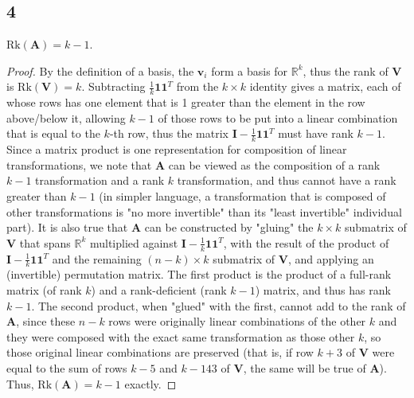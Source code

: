 \documentclass[11pt]{article}
\begin{document}
\subsection*{4} $\mathrm{Rk}(\mathbf{A}) = k-1$.\ \begin{proof} By the definition of a basis, the $\mathbf{v}_i$ form a basis for $\mathbb{R}^k$, thus the rank of $\mathbf{V}$ is $\mathrm{Rk}(\mathbf{V}) = k$. Subtracting $\frac{1}{k}\mathbf{1}\mathbf{1}^T$ from the $k\times k$ identity gives a matrix, each of whose rows has one element that is 1 greater than the element in the row above/below it, allowing $k-1$ of those rows to be put into a linear combination that is equal to the $k$-th row, thus the matrix $\mathbf{I} - \frac{1}{k}\mathbf{1}\mathbf{1}^T$ must have rank $k-1$. Since a matrix product is one representation for composition of linear transformations, we note that $\mathbf{A}$ can be viewed as the composition of a rank $k-1$ transformation and a rank $k$ transformation, and thus cannot have a rank greater than $k-1$ (in simpler language, a transformation that is composed of other transformations is "no more invertible" than its "least invertible" individual part). It is also true that $\mathbf{A}$ can be constructed by "gluing"  the $k\times k$ submatrix of $\mathbf{V}$ that spans $\mathbb{R}^k$ multiplied against  $\mathbf{I} - \frac{1}{k}\mathbf{1}\mathbf{1}^T$, with the result of the product of $\mathbf{I} - \frac{1}{k}\mathbf{1}\mathbf{1}^T$ and the remaining $(n-k)\times k$ submatrix of $\mathbf{V}$, and applying an (invertible) permutation matrix. The first product is the product of a full-rank matrix (of rank $k$) and a rank-deficient (rank $k-1$) matrix, and thus has rank $k-1$. The second product, when "glued" with the first, cannot add to the rank of $\mathbf{A}$, since these $n-k$ rows were originally linear combinations of the other $k$ and they were composed with the exact same transformation as those other $k$, so those original linear combinations are preserved (that is, if row $k+3$ of $\mathbf{V}$ were equal to the sum of rows $k-5$ and $k-143$ of $\mathbf{V}$, the same will be true of $\mathbf{A}$). Thus, $\mathrm{Rk}(\mathbf{A}) = k-1$ exactly.
\end{proof}
\end{document}

